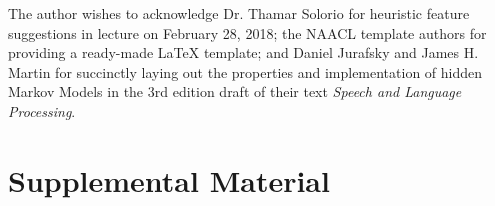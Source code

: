 \documentclass[11pt,a4paper]{article}
\begin{document}
The author wishes to acknowledge Dr. Thamar Solorio for heuristic feature suggestions in
lecture on February 28, 2018; the NAACL template authors for providing a ready-made
{\LaTeX} template; and Daniel Jurafsky and James H. Martin for succinctly laying out the
properties and implementation of hidden Markov Models in the 3rd edition draft of their
text \emph{Speech and Language Processing}.




\appendix

\section{Supplemental Material}
\label{sec:supplemental}
\end{document}
